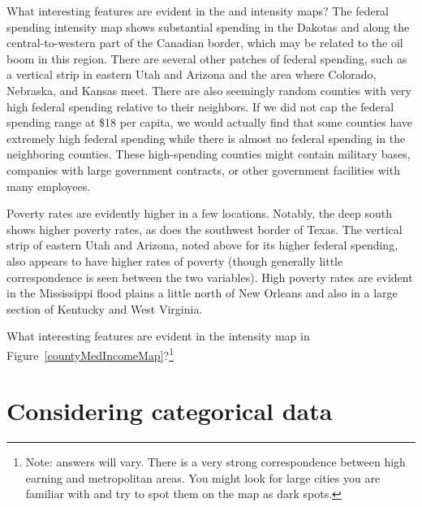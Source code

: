 \begin{example}{What interesting features are evident in the  and  intensity maps?}
The federal spending intensity map shows substantial spending in the Dakotas and along the central-to-western part of the Canadian border, which may be related to the oil boom in this region. There are several other patches of federal spending, such as a vertical strip in eastern Utah and Arizona and the area where Colorado, Nebraska, and Kansas meet. There are also seemingly random counties with very high federal spending relative to their neighbors. If we did not cap the federal spending range at \$18 per capita, we would actually find that some counties have extremely high federal spending while there is almost no federal spending in the neighboring counties. These high-spending counties might contain military bases, companies with large government contracts, or other government facilities with many employees.

Poverty rates are evidently higher in a few locations. Notably, the deep south shows higher poverty rates, as does the southwest border of Texas. The vertical strip of eastern Utah and Arizona, noted above for its higher federal spending, also appears to have higher rates of poverty (though generally little correspondence is seen between the two variables).  High poverty rates are evident in the Mississippi flood plains a little north of New Orleans and also in a large section of Kentucky and West Virginia.
\end{example}

\begin{exercise}
What interesting features are evident in the  intensity map in Figure~\ref{countyMedIncomeMap}?\footnote{Note: answers will vary. There is a very strong correspondence between high earning and metropolitan areas. You might look for large cities you are familiar with and try to spot them on the map as dark spots.}
\end{exercise}




\textC{\newpage}

\section[Considering categorical data]{Considering categorical data }
\label{categoricalData}

